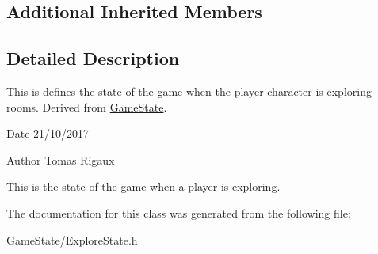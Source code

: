 \subsection*{Additional Inherited Members}


\subsection{Detailed Description}
This is defines the state of the game when the player character is exploring rooms. Derived from \hyperlink{classGameState}{Game\-State}. 

\begin{DoxyDate}{Date}
21/10/2017 
\end{DoxyDate}
\begin{DoxyAuthor}{Author}
Tomas Rigaux
\end{DoxyAuthor}
This is the state of the game when a player is exploring. 

The documentation for this class was generated from the following file\-:\begin{DoxyCompactItemize}
\item 
Game\-State/Explore\-State.\-h\end{DoxyCompactItemize}
